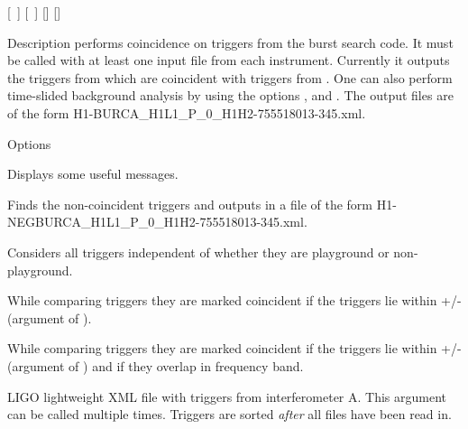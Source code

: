 \begin{entry}
 \newline \hspace*{0.5in}
[~] \newline \hspace*{0.5in}
[~] \newline \hspace*{0.5in}
[] \newline \hspace*{0.5in}
[] \newline \hspace*{0.5in}


\item[Description] 
 performs coincidence on triggers from the burst
search code.  It must be called with at least one input file from each 
instrument.  Currently it outputs the triggers from  which
are coincident with triggers from .  One can also perform
time-slided background analysis by using the options ,
   and .  The output files
are of the form H1-BURCA\_H1L1\_P\_0\_H1H2-755518013-345.xml.
      

\item[Options]\leavevmode
\begin{entry}
\item[\option{--verbose}]  Displays some useful messages.

\item[\option{--noncoincident}]  Finds the non-coincident triggers and
outputs in a file of the form H1-NEGBURCA\_H1L1\_P\_0\_H1H2-755518013-345.xml.

\item[\option{--ignore-playground}] Considers all triggers independent of 
whether they are playground or non-playground. 

\item[\option{--ignore-tfcomparison}] While comparing triggers they are marked 
coincident if the triggers lie within +/- (argument of 
).

\item[\option{--ignore-tcomparison}] While comparing triggers they are marked 
coincident if the triggers lie within +/- (argument of 
) and if they overlap in frequency band.

\item[\option{--ifo-a} \parm{trigfile.a}]  LIGO lightweight XML file with
triggers from interferometer A.  This argument can be called multiple
times.  Triggers are sorted \emph{after} all files have been read in. 


\end{entry}
\end{entry}
